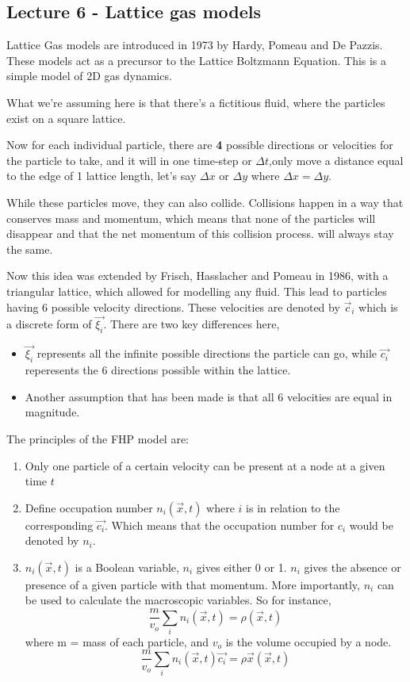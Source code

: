 \documentclass{article}
\begin{document}
\subsection{Lecture 6 - Lattice gas models}
Lattice Gas models are introduced in 1973 by Hardy, Pomeau and De Pazzis. These models act as a precursor to the Lattice Boltzmann Equation. This is a simple model of 2D gas dynamics.

What we're assuming here is that there's a fictitious fluid, where the particles exist on a square lattice.

Now for each individual particle, there are \textbf{4} possible directions or velocities for the particle to take, and it will in one time-step or $\Delta t$,only move a distance equal to the edge of 1 lattice length, let's say $\Delta x$ or $\Delta y$ where $\Delta x = \Delta y$.

While these particles move, they can also collide. Collisions happen in a way that conserves mass and momentum, which means that none of the particles will disappear and that the net momentum of this collision process. will always stay the same. 

Now this idea was extended by Frisch, Hasslacher and Pomeau in 1986, with a triangular lattice, which allowed for modelling any fluid. This lead to particles having 6 possible velocity directions. These velocities are denoted by $\vec{c}_i$ which is a discrete form of $\vec{\xi_i}$. There are two key differences here,

\begin{itemize}
	\item $\vec{\xi_i}$ represents all the infinite possible directions the particle can go, while $\vec{c_i}$ reperesents the 6 directions possible within the lattice.
	\item Another assumption that has been made is that all 6 velocities are equal in magnitude.
\end{itemize}

The principles of the FHP model are:
\begin{enumerate}
	\item Only one particle of a certain velocity can be present at a node at a given time $t$
	\item Define occupation number $n_i(\vec{x}, t)$ where $i$ is in relation to the corresponding $\vec{c_i}$. Which means that the occupation number for $c_i$ would be denoted by $n_i$.
	\item $n_i(\vec{x}, t)$ is a Boolean variable, $n_i$ gives either 0 or 1. $n_i$ gives the absence or presence of a given particle with that momentum. More importantly, $n_i$ can be used to calculate the macroscopic variables.
		So for instance,
		\[
			\frac{m}{v_o} \sum_i n_i (\vec{x},t) = \rho(\vec{x},t)
		\]
		where m = mass of each particle, and $v_o$ is the volume occupied by a node.
		\[
			\frac{m}{v_o} \sum_i n_i (\vec{x},t) \vec{c_i} = \rho \vec{x}(\vec{x},t)
		\]
\end{enumerate}
\end{document}
